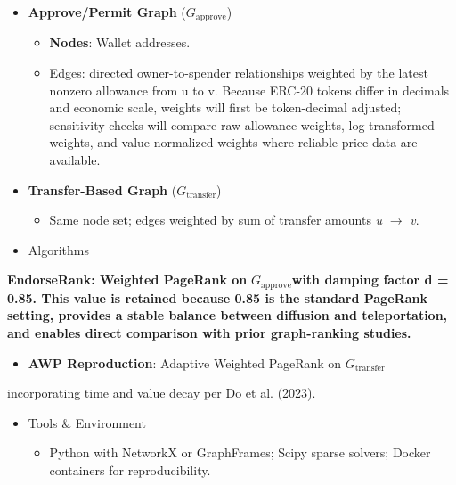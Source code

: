 \begin{itemize}
\item[\textbullet] \textbf{Approve/Permit Graph }($G_{\text{approve}}$)
\begin{itemize}
\item[\textendash] \textbf{Nodes}: Wallet addresses.
\item[\textendash] Edges: directed owner-to-spender relationships weighted by the latest nonzero allowance from u to v. Because ERC-20 tokens differ in decimals and economic scale, weights will first be token-decimal adjusted; sensitivity checks will compare raw allowance weights, log-transformed weights, and value-normalized weights where reliable price data are available.
\end{itemize}
\item[\textbullet] \textbf{Transfer-Based Graph }($G_{\text{transfer}}$)
\begin{itemize}
\item[\textendash] Same node set; edges weighted by sum of transfer amounts \emph{u }\(\to\) \emph{v}.
\end{itemize}
\item[\textbullet] Algorithms
\end{itemize}
\textbf{EndorseRank: Weighted PageRank on }$G_{\text{approve}}$\textbf{with damping factor d = 0.85. This value is retained because 0.85 is the standard PageRank setting, provides a stable balance between diffusion and teleportation, and enables direct comparison with prior graph-ranking studies.}


\begin{itemize}
\item[\textendash] \textbf{AWP Reproduction}: Adaptive Weighted PageRank on $G_{\text{transfer}}$
\end{itemize}
incorporating time and value decay per Do et al. (2023).


\begin{itemize}
\item[\textbullet] Tools \& Environment
\begin{itemize}
\item[\textendash] Python with NetworkX or GraphFrames; Scipy sparse solvers; Docker containers for reproducibility.
\end{itemize}
\end{itemize}

